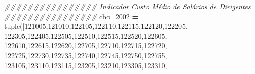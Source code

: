 \documentclass[
  12,
  dvipsnames]{article}
\newenvironment{Shaded}{\begin{snugshade}}{\end{snugshade}}
\newcommand{\BuiltInTok}[1]{#1}
\newcommand{\CommentTok}[1]{\textcolor[rgb]{0.56,0.35,0.01}{\textit{#1}}}
\newcommand{\NormalTok}[1]{#1}
\newcommand{\OperatorTok}[1]{\textcolor[rgb]{0.81,0.36,0.00}{\textbf{#1}}}
\newcommand{\StringTok}[1]{\textcolor[rgb]{0.31,0.60,0.02}{#1}}
\begin{document}
\begin{Shaded}
\begin{Highlighting}[]
\CommentTok{\#\#\#\#\#\#\#\#\#\#\#\#\#\#\#\# Indicador Custo Médio de Salários de Dirigentes \#\#\#\#\#\#\#\#\#\#\#\#\#\#\#\#}
\NormalTok{cbo\_2002 }\OperatorTok{=} \BuiltInTok{tuple}\NormalTok{([}\StringTok{\textquotesingle{}121005\textquotesingle{}}\NormalTok{,}\StringTok{\textquotesingle{}121010\textquotesingle{}}\NormalTok{,}\StringTok{\textquotesingle{}122105\textquotesingle{}}\NormalTok{,}\StringTok{\textquotesingle{}122110\textquotesingle{}}\NormalTok{,}\StringTok{\textquotesingle{}122115\textquotesingle{}}\NormalTok{,}\StringTok{\textquotesingle{}122120\textquotesingle{}}\NormalTok{,}\StringTok{\textquotesingle{}122205\textquotesingle{}}\NormalTok{,}
                  \StringTok{\textquotesingle{}122305\textquotesingle{}}\NormalTok{,}\StringTok{\textquotesingle{}122405\textquotesingle{}}\NormalTok{,}\StringTok{\textquotesingle{}122505\textquotesingle{}}\NormalTok{,}\StringTok{\textquotesingle{}122510\textquotesingle{}}\NormalTok{,}\StringTok{\textquotesingle{}122515\textquotesingle{}}\NormalTok{,}\StringTok{\textquotesingle{}122520\textquotesingle{}}\NormalTok{,}\StringTok{\textquotesingle{}122605\textquotesingle{}}\NormalTok{,}
                  \StringTok{\textquotesingle{}122610\textquotesingle{}}\NormalTok{,}\StringTok{\textquotesingle{}122615\textquotesingle{}}\NormalTok{,}\StringTok{\textquotesingle{}122620\textquotesingle{}}\NormalTok{,}\StringTok{\textquotesingle{}122705\textquotesingle{}}\NormalTok{,}\StringTok{\textquotesingle{}122710\textquotesingle{}}\NormalTok{,}\StringTok{\textquotesingle{}122715\textquotesingle{}}\NormalTok{,}\StringTok{\textquotesingle{}122720\textquotesingle{}}\NormalTok{,}
                  \StringTok{\textquotesingle{}122725\textquotesingle{}}\NormalTok{,}\StringTok{\textquotesingle{}122730\textquotesingle{}}\NormalTok{,}\StringTok{\textquotesingle{}122735\textquotesingle{}}\NormalTok{,}\StringTok{\textquotesingle{}122740\textquotesingle{}}\NormalTok{,}\StringTok{\textquotesingle{}122745\textquotesingle{}}\NormalTok{,}\StringTok{\textquotesingle{}122750\textquotesingle{}}\NormalTok{,}\StringTok{\textquotesingle{}122755\textquotesingle{}}\NormalTok{,}
                  \StringTok{\textquotesingle{}123105\textquotesingle{}}\NormalTok{,}\StringTok{\textquotesingle{}123110\textquotesingle{}}\NormalTok{,}\StringTok{\textquotesingle{}123115\textquotesingle{}}\NormalTok{,}\StringTok{\textquotesingle{}123205\textquotesingle{}}\NormalTok{,}\StringTok{\textquotesingle{}123210\textquotesingle{}}\NormalTok{,}\StringTok{\textquotesingle{}123305\textquotesingle{}}\NormalTok{,}\StringTok{\textquotesingle{}123310\textquotesingle{}}\NormalTok{,}

\end{Highlighting}
\end{Shaded}
\end{document}
